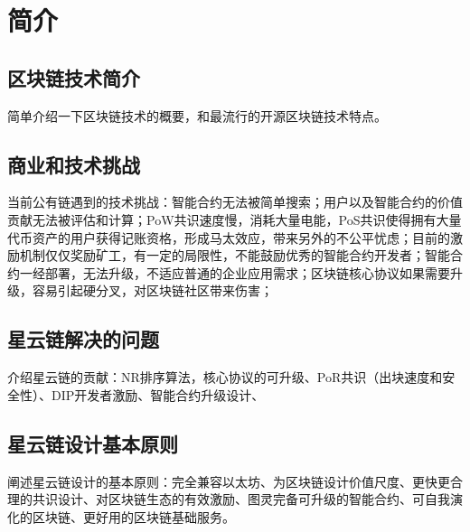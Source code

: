 \section{简介}

\subsection{区块链技术简介}
简单介绍一下区块链技术的概要，和最流行的开源区块链技术特点。


\subsection{商业和技术挑战}
当前公有链遇到的技术挑战：智能合约无法被简单搜索；用户以及智能合约的价值贡献无法被评估和计算；PoW共识速度慢，消耗大量电能，PoS共识使得拥有大量代币资产的用户获得记账资格，形成马太效应，带来另外的不公平忧虑；目前的激励机制仅仅奖励矿工，有一定的局限性，不能鼓励优秀的智能合约开发者；智能合约一经部署，无法升级，不适应普通的企业应用需求；区块链核心协议如果需要升级，容易引起硬分叉，对区块链社区带来伤害；

\subsection{星云链解决的问题}
介绍星云链的贡献：NR排序算法，核心协议的可升级、PoR共识（出块速度和安全性）、DIP开发者激励、智能合约升级设计、


\subsection{星云链设计基本原则}
阐述星云链设计的基本原则：完全兼容以太坊、为区块链设计价值尺度、更快更合理的共识设计、对区块链生态的有效激励、图灵完备可升级的智能合约、可自我演化的区块链、更好用的区块链基础服务。
